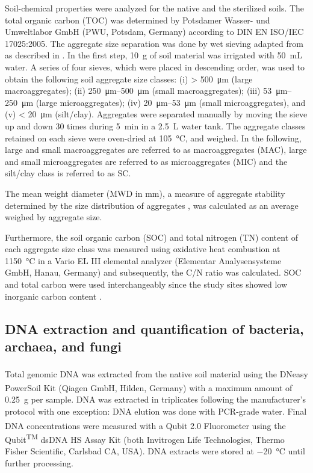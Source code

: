 Soil-chemical properties were analyzed for the native and the sterilized soils. 
The total organic carbon (TOC) was determined by Potsdamer Wasser- und Umweltlabor GmbH (PWU, Potsdam, Germany) according to DIN EN ISO/IEC 17025:2005. 
The aggregate size separation was done by wet sieving adapted from \citet{Elliott1986} as described in \citet{RiverasMunoz2022}. 
In the first step, \SI{10}{\gram} of soil material was irrigated with \SI{50}{\milli\liter} water. 
A series of four sieves, which were placed in descending order, was used to obtain the following soil aggregate size classes: 
(i) \SI{> 500}{\micro\metre} (large macroaggregates); 
(ii) \SIrange{250}{500}{\micro\metre} (small macroaggregates); 
(iii) \SIrange{53}{250}{\micro\metre} (large microaggregates); 
(iv) \SIrange{20}{53}{\micro\metre} (small microaggregates), and 
(v) \SI{< 20}{\micro\metre} (silt/clay). 
Aggregates were separated manually by moving the sieve up and down 30 times during \SI{5}{\minute} in a \SI{2.5}{\liter} water tank. 
The aggregate classes retained on each sieve were oven-dried at \SI{105}{\degreeCelsius}, and weighed. 
In the following, large and small macroaggregates are referred to as macroaggregates (MAC), large and small microaggregates are referred to as microaggregates (MIC) and the silt/clay class is referred to as SC.

The mean weight diameter (MWD in \si{\milli\metre}), a measure of aggregate stability determined by the size distribution of aggregates \citep{Amezketa1999}, was calculated as an average weighed by aggregate size.

Furthermore, the soil organic carbon (SOC) and total nitrogen (TN) content of each aggregate size class was measured using oxidative heat combustion at \SI{1150}{\degreeCelsius} in a Vario EL III elemental analyzer (Elementar Analysensysteme GmbH, Hanau, Germany) and subsequently, the C/N ratio was calculated. 
SOC and total carbon were used interchangeably since the study sites showed low inorganic carbon content \citep{RiverasMunoz2022}.

\subsection{DNA extraction and quantification of bacteria, archaea, and fungi}

Total genomic DNA was extracted from the native soil material using the DNeasy\textsuperscript{\textregistered} PowerSoil\textsuperscript{\textregistered} Kit (Qiagen GmbH, Hilden, Germany) with a maximum amount of \SI{0.25}{\gram} per sample. 
DNA was extracted in triplicates following the manufacturer’s protocol with one exception: DNA elution was done with PCR-grade water. 
Final DNA concentrations were measured with a Qubit\textsuperscript{\textregistered} 2.0 Fluorometer using the Qubit\textsuperscript{TM} dsDNA HS Assay Kit (both Invitrogen Life Technologies, Thermo Fisher Scientific, Carlsbad CA, USA). 
DNA extracts were stored at \SI{-20}{\degreeCelsius} until further processing.

